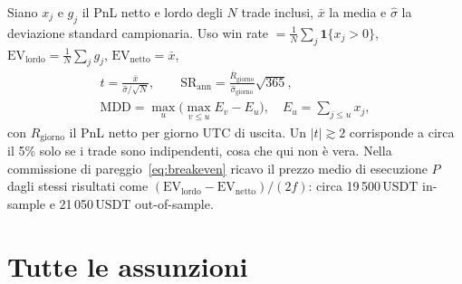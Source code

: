 \documentclass[a4paper,11pt]{article}
\newcommand{\EV}{\mathrm{EV}}
\newcommand{\usdt}{\ensuremath{\,\mathrm{USDT}}}
\begin{document}
Siano $x_j$ e $g_j$ il PnL netto e lordo degli $N$ trade inclusi, $\bar x$ la media e
$\hat\sigma$ la deviazione standard campionaria. Uso win rate $=\frac1N\sum_j
\mathbf{1}\{x_j>0\}$, $\EV_{\mathrm{lordo}} = \frac1N \sum_j g_j$, $\EV_{\mathrm{netto}} = \bar x$,
\begin{gather}
  t = \frac{\bar x}{\hat\sigma/\sqrt{N}}, \qquad
  \mathrm{SR}_{\mathrm{ann}} = \frac{\overline{R}_{\mathrm{giorno}}}{\hat\sigma_{\mathrm{giorno}}}\sqrt{365}, \\
  \mathrm{MDD} = \max_{u} \Big( \max_{v\le u} E_v - E_u \Big),\quad E_u = \textstyle\sum_{j\le u} x_j,
\end{gather}
con $R_{\mathrm{giorno}}$ il PnL netto per giorno UTC di uscita. Un $|t|\gtrsim 2$ corrisponde a
circa il 5\% solo se i trade sono indipendenti, cosa che qui non è vera. Nella
commissione di pareggio~\eqref{eq:breakeven} ricavo il prezzo medio di esecuzione $P$ dagli
stessi risultati come $(\EV_{\mathrm{lordo}} - \EV_{\mathrm{netto}})/(2f)$: circa
19\,500\usdt{} in-sample e 21\,050\usdt{} out-of-sample.

\section{Tutte le assunzioni}
\label{app:assunzioni}
\end{document}
